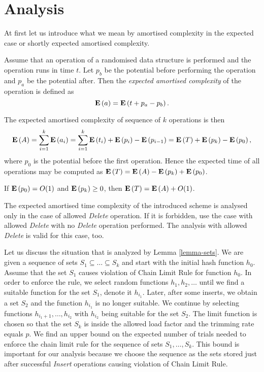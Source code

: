 \section{Analysis}

At first let us introduce what we mean by amortised complexity in the expected case or shortly expected amortised complexity.

\begin{definition}
Assume that an operation of a randomised data structure is performed and the operation runs in time $t$. Let $p_b$ be the potential before performing the operation and $p_a$ be the potential after. Then the \emph{expected amortised complexity} of the operation is defined as \[ \mathbf{E}\left(a\right) = \mathbf{E}\left(t + p_a - p_{b}\right) \text{.} \]
\end{definition}

The expected amortised complexity of sequence of $k$ operations is then
\[
\mathbf{E}\left(A\right) = \sum_{i=1}^{k} \mathbf{E}\left(a_i\right) = \sum_{i = 1}^{k} \mathbf{E}\left(t_i\right) + \mathbf{E}\left(p_i\right) - \mathbf{E}\left(p_{i - 1}\right) = \mathbf{E}\left(T\right) + \mathbf{E}\left(p_k\right) - \mathbf{E}\left(p_0\right),
\]
where $p_0$ is the potential before the first operation. Hence the expected time of all operations may be computed as $\mathbf{E}\left(T\right) = \mathbf{E}\left(A\right) - \mathbf{E}\left(p_k\right) + \mathbf{E}\left(p_0\right)$.

\begin{remark}
\label{remark-expected-sequence}
If $\mathbf{E}\left(p_0\right) = O(1)$ and $\mathbf{E}\left(p_k\right) \geq 0$, then $\mathbf{E}\left(T\right) = \mathbf{E}\left(A\right) + O(1)$.
\end{remark}

The expected amortised time complexity of the introduced scheme is analysed only in the case of allowed \emph{Delete} operation. If it is forbidden, use the case with allowed \emph{Delete} with no \emph{Delete} operation performed. The analysis with allowed \emph{Delete} is valid for this case, too.

Let us discuss the situation that is analyzed by Lemma \ref{lemma-sets}. We are given a sequence of sets $S_1 \subseteq \dots \subseteq S_k$ and start with the initial hash function $h_0$. Assume that the set $S_1$ causes violation of Chain Limit Rule for function $h_0$. In order to enforce the rule, we select random functions $h_1, h_2, \dots$ until we find a suitable function for the set $S_1$, denote it $h_{i_1}$. Later, after some inserts, we obtain a set $S_2$ and the function $h_{i_1}$ is no longer suitable. We continue by selecting functions $h_{i_1 + 1}, \dots, h_{i_2}$ with $h_{i_2}$ being suitable for the set $S_2$. The limit function is chosen so that the set $S_k$ is inside the allowed load factor and the trimming rate equals $p$. We find an upper bound on the expected number of trials needed to enforce the chain limit rule for the sequence of sets $S_1, \dots, S_k$. This bound is important for our analysis because we choose the sequence as  the sets stored just after successful \emph{Insert} operations causing violation of Chain Limit Rule.

